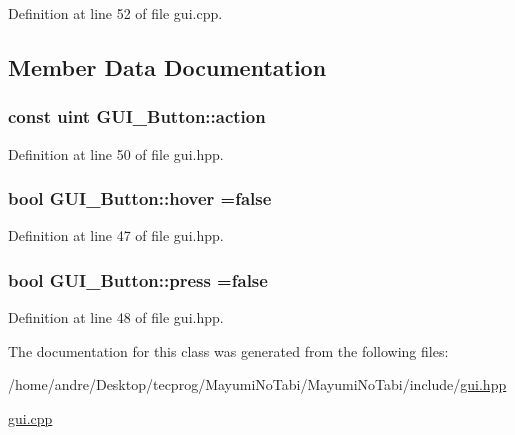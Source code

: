 Definition at line 52 of file gui.\-cpp.



\subsection{Member Data Documentation}
\hypertarget{class_g_u_i___button_ad6e4c254d6d3d45c6584643959c7ff40}{
\subsubsection[{action}]{\setlength{\rightskip}{0pt plus 5cm}const {\bf uint} G\-U\-I\-\_\-\-Button\-::action}}\label{class_g_u_i___button_ad6e4c254d6d3d45c6584643959c7ff40}


Definition at line 50 of file gui.\-hpp.

\hypertarget{class_g_u_i___button_a8d794e4ce0e61491502d99a9102f4b8d}{
\subsubsection[{hover}]{\setlength{\rightskip}{0pt plus 5cm}bool G\-U\-I\-\_\-\-Button\-::hover =false\hspace{0.3cm}{\ttfamily [protected]}}}\label{class_g_u_i___button_a8d794e4ce0e61491502d99a9102f4b8d}


Definition at line 47 of file gui.\-hpp.

\hypertarget{class_g_u_i___button_a2b85285142eedc800fe71c2e33e9e433}{
\subsubsection[{press}]{\setlength{\rightskip}{0pt plus 5cm}bool G\-U\-I\-\_\-\-Button\-::press =false\hspace{0.3cm}{\ttfamily [protected]}}}\label{class_g_u_i___button_a2b85285142eedc800fe71c2e33e9e433}


Definition at line 48 of file gui.\-hpp.



The documentation for this class was generated from the following files\-:\begin{DoxyCompactItemize}
\item 
/home/andre/\-Desktop/tecprog/\-Mayumi\-No\-Tabi/\-Mayumi\-No\-Tabi/include/\hyperlink{gui_8hpp}{gui.\-hpp}\item 
\hyperlink{gui_8cpp}{gui.\-cpp}\end{DoxyCompactItemize}

